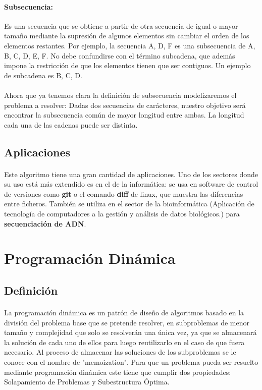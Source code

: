 \documentclass{article}
\begin{document}
		\paragraph{Subsecuencia:}
		Es una secuencia que se obtiene a partir de otra secuencia de igual o mayor tamaño mediante la supresión de algunos elementos sin cambiar el orden de los elementos restantes. Por ejemplo, la secuencia A, D, F es una subsecuencia de A, B, C, D, E, F. 
		\newline
		No debe confundirse con el término subcadena, que además impone la restricción de que los elementos tienen que ser contiguos. Un ejemplo de subcadena es B, C, D.
		
		\paragraph{}
		Ahora que ya tenemos clara la definición de subsecuencia modelizaremos el problema a resolver:
		\newline
		Dadas dos secuencias de carácteres, nuestro objetivo será encontrar la subsecuencia común de mayor longitud entre ambas. La longitud cada una de las cadenas puede ser distinta.

	\subsection{Aplicaciones}
		\paragraph{}
		Este algoritmo tiene una gran cantidad de aplicaciones. Uno de los sectores donde su uso está más extendido es en el de la informática: se usa en software de control de versiones como \textbf{git} o el comando \textbf{diff} de linux, que muestra las diferencias entre ficheros. También se utiliza en el sector de la bioinformática (Aplicación de tecnología de computadores a la gestión y análisis de datos biológicos.) para \textbf{secuenciación de ADN}.

\section{Programación Dinámica}
	\subsection{Definición}
		\paragraph{}
		La programación dinámica es un patrón de diseño de algoritmos basado en la división del problema base que se pretende resolver, en subproblemas de menor tamaño y complejidad que solo se resolverán una única vez, ya que se almacenará la solución de cada uno de ellos para luego reutilizarlo en el caso de que fuera necesario. Al proceso de almacenar las soluciones de los subproblemas se le conoce con el nombre de "memoization". Para que un problema pueda ser resuelto mediante programación dinámica este tiene que cumplir dos propiedades: Solapamiento de Problemas y Subestructura Óptima.
\end{document}
